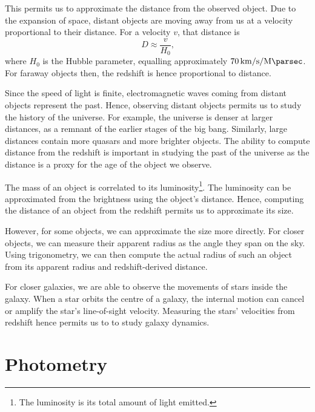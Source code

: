 \documentclass[11pt,twoside,openright]{report}
\begin{document}
  This permits us to approximate the distance from the observed object. Due to the expansion of space, distant objects are moving away from us at a velocity proportional to their distance. For a velocity $v$, that distance is \[
      D \approx \frac{v}{H_0} \text{,}
  \] where $H_0$ is the Hubble parameter, equalling approximately $\SI{70}{\kilo\meter\per\second\per\mega\parsec}$. For faraway objects then, the redshift is hence proportional to distance.

  Since the speed of light is finite, electromagnetic waves coming from distant objects represent the past. Hence, observing distant objects permits us to study the history of the universe. For example, the universe is denser at larger distances, as a remnant of the earlier stages of the big bang. Similarly, large distances contain more quasars and more brighter objects. The ability to compute distance from the redshift is important in studying the past of the universe as the distance is a proxy for the age of the object we observe.

  The mass of an object is correlated to its luminosity\footnote{The luminosity is its total amount of light emitted.}. The luminosity can be approximated from the brightness using the object's distance. Hence, computing the distance of an object from the redshift permits us to approximate its size.

  However, for some objects, we can approximate the size more directly. For closer objects, we can measure their apparent radius as the angle they span on the sky. Using trigonometry, we can then compute the actual radius of such an object from its apparent radius and redshift-derived distance.

  For closer galaxies, we are able to observe the movements of stars inside the galaxy. When a star orbits the centre of a galaxy, the internal motion can cancel or amplify the star's line-of-sight velocity. Measuring the stars' velocities from redshift hence permits us to to study galaxy dynamics.

\chapter{Photometry}
\end{document}
